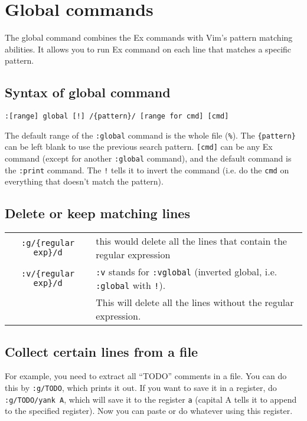 \chapter{Global commands}

The global command combines the Ex commands with Vim's pattern matching abilities.
It allows you to run Ex command on each line that matches a specific pattern.

\section{Syntax of global command}

{\large\verb|:[range] global [!] /{pattern}/ [range for cmd] [cmd]|}
\newline

The default range of the \verb|:global| command is the whole file (\verb|%|).
The \verb|{pattern}| can be left blank to use the previous search pattern.
\verb|[cmd]| can be any Ex command (except for another \verb|:global| command), and the default command is the \verb|:print| command.
The \verb|!| tells it to invert the command (i.e. do the \verb|cmd| on everything that doesn't match the pattern).

\section{Delete or keep matching lines}

\begin{tabular}{c|l}
\verb|:g/{regular exp}/d| & this would delete all the lines that contain the regular expression\\
\verb|:v/{regular exp}/d| & \verb|:v| stands for \verb|:vglobal| (inverted global, i.e. \verb|:global| with \verb|!|).\\
& This will delete all the lines without the regular expression.\\
\end{tabular}

\section{Collect certain lines from a file}

For example, you need to extract all ``TODO'' comments in a file.
You can do this by \verb|:g/TODO|, which prints it out.
If you want to save it in a register, do \verb|:g/TODO/yank A|, which will save it to the register \verb|a| (capital A tells it to append to the specified register).
Now you can paste or do whatever using this register.

